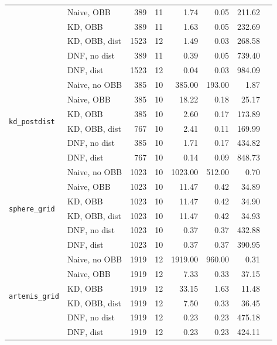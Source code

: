 \begin{table}[htbp]
\begin{tabular}{@{}llrrrrrr@{}}
     & Naive, OBB & 389 & 11 & 1.74 & 0.05 & 211.62 \\
     & KD, OBB & 389 & 11 & 1.63 & 0.05 & 232.69 \\
     & KD, OBB, dist & 1523 & 12 & 1.49 & 0.03 & 268.58 \\
     & DNF, no dist & 389 & 11 & 0.39 & 0.05 & 739.40 \\
     & DNF, dist & 1523 & 12 & 0.04 & 0.03 & 984.09 \\
    \midrule
    \multirow{6}{*}{\texttt{kd\_postdist}} & Naive, no OBB & 385 & 10 & 385.00 & 193.00 & 1.87 \\
     & Naive, OBB & 385 & 10 & 18.22 & 0.18 & 25.17 \\
     & KD, OBB & 385 & 10 & 2.60 & 0.17 & 173.89 \\
     & KD, OBB, dist & 767 & 10 & 2.41 & 0.11 & 169.99 \\
     & DNF, no dist & 385 & 10 & 1.71 & 0.17 & 434.82 \\
     & DNF, dist & 767 & 10 & 0.14 & 0.09 & 848.73 \\
    \midrule
    \multirow{6}{*}{\texttt{sphere\_grid}} & Naive, no OBB & 1023 & 10 & 1023.00 & 512.00 & 0.70 \\
     & Naive, OBB & 1023 & 10 & 11.47 & 0.42 & 34.89 \\
     & KD, OBB & 1023 & 10 & 11.47 & 0.42 & 34.90 \\
     & KD, OBB, dist & 1023 & 10 & 11.47 & 0.42 & 34.93 \\
     & DNF, no dist & 1023 & 10 & 0.37 & 0.37 & 432.88 \\
     & DNF, dist & 1023 & 10 & 0.37 & 0.37 & 390.95 \\
    \midrule
    \multirow{6}{*}{\texttt{artemis\_grid}} & Naive, no OBB & 1919 & 12 & 1919.00 & 960.00 & 0.31 \\
     & Naive, OBB & 1919 & 12 & 7.33 & 0.33 & 37.15 \\
     & KD, OBB & 1919 & 12 & 33.15 & 1.63 & 11.48 \\
     & KD, OBB, dist & 1919 & 12 & 7.50 & 0.33 & 36.45 \\
     & DNF, no dist & 1919 & 12 & 0.23 & 0.23 & 475.18 \\
     & DNF, dist & 1919 & 12 & 0.23 & 0.23 & 424.11 \\
    \bottomrule
  \end{tabular}
\end{table}
